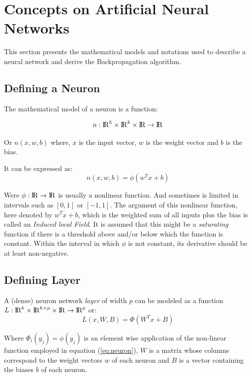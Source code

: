 \documentclass[10pt,journal,compsoc]{IEEEtran}
\newcommand{\ce}[1]{equation (\ref{#1})}
\newcommand{\reals}{{\rm I\!R}}
\begin{document}
\section{Concepts on Artificial Neural Networks}\label{sec:nndef}

This section presents the mathematical models and notations used to describe a neural network and derive the Backpropagation algorithm.

\subsection{Defining a Neuron}

The mathematical model of a neuron is a function: 

\begin{equation}
	n:\reals^k\times\reals^k\times\reals\rightarrow\reals
\end{equation} 



Or $n(x, w, b)$ where, $x$ is the input vector, $w$ is the weight vector and $b$ is the bias. 

It can be expressed as:
\begin{equation} \label{eq:neuron}
	n(x, w, b)= \phi(w^Tx+b)
\end{equation}

Were $\phi: \reals \rightarrow \reals$ is usually a nonlinear function. And sometimes is limited in intervals such as $[0,1]$ or $[-1, 1]$. The argument of this nonlinear function, here denoted by $w^Tx+b$, which is the weighted sum of all inputs plus the bias is called an \textit{Induced local Field}. It is assumed that this might be a \textit{saturating} function if there is a threshold above and/or below which the function is constant. Within the interval in which $\phi$ is not constant, its derivative should be at least non-negative.

\subsection{Defining Layer}

A (dense) neuron network \textit{layer} of width $p$ can be modeled as a function $L:\reals^k\times\reals^{k\times p}\times\reals\rightarrow\reals^p$ or:
\begin{equation}
	L(x, W, B) = \Phi(W^Tx + B)
\end{equation}

Where $\Phi_i(y_j) = \phi(y_j)$ is an element wise application of the non-linear function employed in \ce{eq:neuron}, $W$ is a matrix whose columns correspond to the weight vectors $w$ of each neuron and $B$ is a vector containing the biases $b$ of each neuron.
\end{document}
